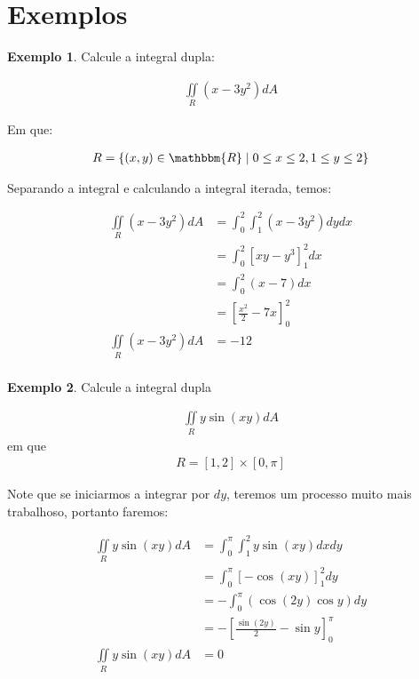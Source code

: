 \documentclass{article}
\newcommand{\doubleint}[1] {\iint\limits_R #1 dA}
\theoremstyle{definition}
\newtheorem{example}{Exemplo}[section]
\begin{document}
    \section{Exemplos}
        \begin{example}
            Calcule a integral dupla:

            \begin{align*}
                \doubleint{(x - 3y^2)}
            \end{align*}

            Em que:

            \begin{align*}
                R = \{ (x,y) \in \mathbbm{R} \mid 0 \leq x \leq 2, 1 \leq y \leq 2\}
            \end{align*}

            Separando a integral e calculando a integral iterada, temos:

            \begin{align*}
                \doubleint{(x - 3y^2)} &= \int_0^2 \int_1^2 (x - 3y^2) dy dx\\
                &= \int_0^2 \left[ xy - y^3 \right]_1^2 dx\\
                &= \int_0^2 (x - 7) dx\\
                &= \left[ \frac{x^2}{2} - 7x \right]_0^2\\
                \doubleint{(x - 3y^2)} &= -12\\
            \end{align*}
        \end{example}

        \begin{example}
            Calcule a integral dupla

            \begin{align*}
                \doubleint{y\sin{(xy)}}
            \end{align*}
            em que
            \begin{align*}
                R = [1,2] \times [0, \pi]
            \end{align*}

            Note que se iniciarmos a integrar por $dy$, teremos um processo muito
            mais trabalhoso, portanto faremos:

            \begin{align*}
                \doubleint{y\sin{(xy)}} &= \int_0^\pi \int_1^2 y \sin{(xy)} dx dy\\
                &= \int_0^\pi \left[-\cos{(xy)}\right]_1^2 dy\\
                &= - \int_0^\pi (\cos{(2y)} \cos{y}) dy\\
                &= - \left[ \frac{\sin{(2y)}}{2} - \sin{y} \right]_0^\pi\\
                \doubleint{y\sin{(xy)}} &= 0
            \end{align*}
        \end{example}
\end{document}
